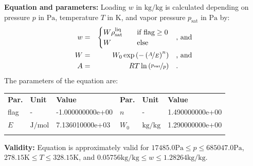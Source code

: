 \textbf{Equation and parameters:}
\newline
%
Loading $w$ in $\si{\kilogram\per\kilogram}$ is calculated depending on pressure $p$ in $\si{\pascal}$, temperature $T$ in $\si{\kelvin}$, and vapor pressure $p_\mathrm{sat}$ in $\si{\pascal}$ by:
%
\begin{equation*}
\begin{split}
w &=& \begin{cases} W \rho_\mathrm{sat}^{\mathrm{liq}} & \quad \text{if flag} \geq 0 \\ W & \quad \text{else} \end{cases} & \quad\text{, and} \\
W &=& W_0 \exp \left( - \left( \nicefrac{A}{E} \right) ^{n} \right) & \quad\text{, and} \\
A &=& R T \ln \left( \nicefrac{p_\mathrm{sat}}{p} \right) & \quad\text{.} \\
\end{split}
\end{equation*}
%
The parameters of the equation are:
%
\begin{longtable}[l]{lll|lll}
\toprule
\addlinespace
\textbf{Par.} & \textbf{Unit} & \textbf{Value} &	\textbf{Par.} & \textbf{Unit} & \textbf{Value} \\
\addlinespace
\midrule
\endhead

\bottomrule
\endfoot
\bottomrule
\endlastfoot
\addlinespace

flag & - & -1.000000000e+00 & $n$ & - & 1.490000000e+00 \\
$E$ & $\si{\joule\per\mole}$ & 7.136010000e+03 & $W_0$ & $\si{\kilogram\per\kilogram}$ & 1.290000000e+00 \\

\addlinespace\end{longtable}

\textbf{Validity:}
\newline
Equation is approximately valid for $17485.0 \si{\pascal} \leq p \leq 685047.0 \si{\pascal}$,  $278.15 \si{\kelvin} \leq T \leq 328.15 \si{\kelvin}$, and $0.05756 \si{\kilogram\per\kilogram} \leq w \leq 1.28264 \si{\kilogram\per\kilogram}$.
\newline

